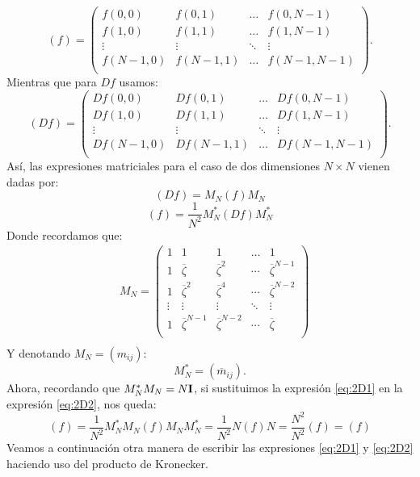 \documentclass{article}
\begin{document}
\[
    (f) = \begin{pmatrix}
    f(0,0) & f(0,1) & \dots & f(0,N-1) \\
    f(1,0) & f(1,1) & \dots & f(1,N-1) \\
    \vdots & \vdots & \ddots & \vdots \\
    f(N-1,0) & f(N-1,1) & \dots & f(N-1,N-1) \\
    \end{pmatrix}.
\]
Mientras que para $Df$ usamos:
\[
    (Df) = \begin{pmatrix}
    Df(0,0) & Df(0,1) & \dots & Df(0,N-1) \\
    Df(1,0) & Df(1,1) & \dots & Df(1,N-1) \\
    \vdots & \vdots & \ddots & \vdots \\
    Df(N-1,0) & Df(N-1,1) & \dots & Df(N-1,N-1) \\
    \end{pmatrix}.
\]
Así, las expresiones matriciales para el caso de dos dimensiones $N \times N$ vienen dadas por:
\begin{equation}
    (Df) = M_N (f) M_N 
    \label{eq:2D1}
\end{equation}
\begin{equation}
    (f) = \frac{1}{N^2} M_N^{\ast} (Df) M_N^{\ast}
    \label{eq:2D2}
\end{equation}
Donde recordamos que:
\begin{align*}
    & M_{N} = \begin{pmatrix}
    1 & 1 & 1 & \dots & 1 \\
    1 & \overline{\zeta} & \overline{\zeta}^{2} & \cdots & \overline{\zeta}^{N-1} \\
    1 & \overline{\zeta}^{2} & \overline{\zeta}^{4} & \cdots & \overline{\zeta}^{N-2} \\
    \vdots & \vdots & \vdots & \ddots & \vdots \\
    1 & \overline{\zeta}^{N-1} & \overline{\zeta}^{N-2} & \cdots & \overline{\zeta} \\
    \end{pmatrix} \\
\end{align*}
Y denotando $M_N = (m_{ij})$:
\[
    M_N^{\ast} = (\overline{m}_{ij}).
\]
Ahora, recordando que $M_N^{\ast} M_N = N {\bf I}$, si sustituimos la expresión \eqref{eq:2D1} en la expresión \eqref{eq:2D2}, nos queda:
\[
    (f) = \frac{1}{N^2} M_N^{\ast} M_N (f) M_N  M_N^{\ast} = \frac{1}{N^2} N (f) N = \frac{N^2}{N^2} (f) = (f)
\]
Veamos a continuación otra manera de escribir las expresiones \eqref{eq:2D1} y \eqref{eq:2D2} haciendo uso del producto de Kronecker.
\end{document}
